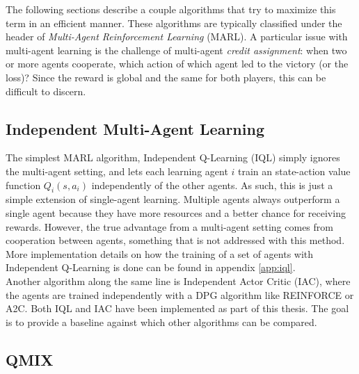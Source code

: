 The following sections describe a couple algorithms that try to maximize this term in an efficient manner. These algorithms are typically classified under the header of \emph{Multi-Agent Reinforcement Learning} (MARL).
A particular issue with multi-agent learning is the challenge of multi-agent \emph{credit assignment}: when two or more agents cooperate, which action of which agent led to the victory (or the loss)? Since the reward is global and the same for both players, this can be difficult to discern.
\subsection{Independent Multi-Agent Learning}
\label{sec:intro_deep_indep_rl}
The simplest MARL algorithm, Independent Q-Learning (IQL) \cite{tan1993multi} simply ignores the multi-agent setting, and lets each learning agent $i$ train an state-action value function $Q_i(s, a_i)$ independently of the other agents. As such, this is just a simple extension of single-agent learning. Multiple agents always outperform a single agent because they have more resources and a better chance for receiving rewards. However, the true advantage from a multi-agent setting comes from cooperation between agents, something that is not addressed with this method. More implementation details on how the training of a set of agents with Independent Q-Learning is done can be found in appendix \ref{app:iql}.\\
Another algorithm along the same line is Independent Actor Critic (IAC), where the agents are trained independently with a DPG algorithm like REINFORCE or A2C. Both IQL and IAC have been implemented as part of this thesis. The goal is to provide a baseline against which other algorithms can be compared.


\subsection{QMIX}
\label{sec:intro_qmix}

